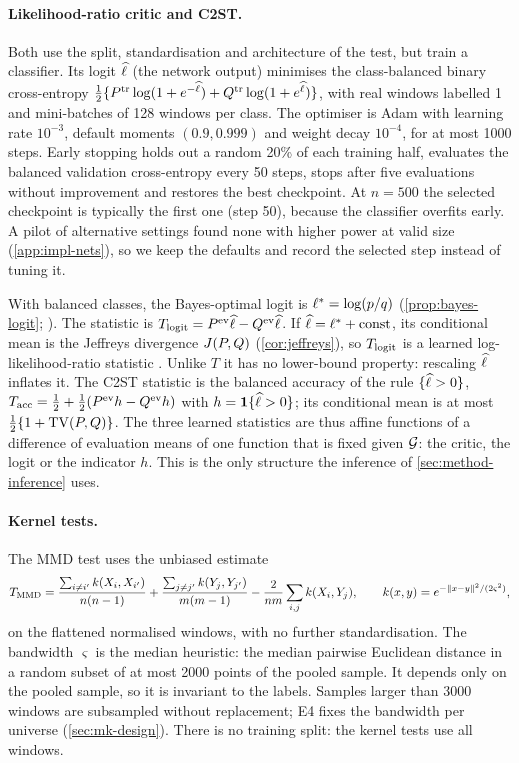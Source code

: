 \paragraph{Likelihood-ratio critic and C2ST.}
Both use the split, standardisation and architecture of the \WC{} test, but train a classifier.
Its logit $\widehat{\ell}$ (the network output) minimises the class-balanced binary cross-entropy
$\tfrac12\{P^{\mathrm{tr}}\log(1+e^{-\widehat{\ell}})+Q^{\mathrm{tr}}\log(1+e^{\widehat{\ell}})\}$, with real windows labelled 1 and
mini-batches of 128 windows per class. The optimiser is Adam with learning rate $10^{-3}$,
default moments $(0.9,0.999)$ and weight decay $10^{-4}$, for at most 1000 steps. Early stopping
holds out a random 20\% of each training half, evaluates the balanced validation cross-entropy
every 50 steps, stops after five evaluations without improvement and restores the best
checkpoint. At $n=500$ the selected checkpoint is typically the first one (step 50), because
the classifier overfits early. A pilot of alternative settings found none with higher
power at valid size (\cref{app:impl-nets}), so we keep the defaults and record the selected step instead of tuning it.

With balanced classes, the Bayes-optimal logit is $\ell^{*}=\log(p/q)$ (\cref{prop:bayes-logit};
\citealp{goodfellow2014generative}). The \LRC{} statistic is $T_{\mathrm{logit}}=P^{\mathrm{ev}}\widehat{\ell}-Q^{\mathrm{ev}}\widehat{\ell}$. If
$\widehat{\ell}=\ell^{*}+\text{const}$, its conditional mean is the Jeffreys divergence $J(P,Q)$
(\cref{cor:jeffreys}), so $T_{\mathrm{logit}}$ is a learned log-likelihood-ratio statistic
\citep{cheng2022classification}. Unlike $T$ it has no lower-bound property: rescaling $\widehat{\ell}$
inflates it. The C2ST statistic \citep{lopezpaz2017revisiting,kim2021classification} is the
balanced accuracy of the rule $\{\widehat{\ell}>0\}$,
$T_{\mathrm{acc}}=\tfrac12+\tfrac12(P^{\mathrm{ev}} h-Q^{\mathrm{ev}} h)$ with $h=\mathbf{1}\{\widehat{\ell}>0\}$; its conditional mean is at
most $\tfrac12\{1+\operatorname{TV}(P,Q)\}$. The three learned statistics are thus affine functions of a
difference of evaluation means of one function that is fixed given $\mathcal{G}$: the critic, the
logit or the indicator $h$. This is the only structure the inference of
\cref{sec:method-inference} uses.

\paragraph{Kernel tests.}
The MMD test \citep{gretton2012kernel} uses the unbiased estimate
\begin{equation}\label{eq:mmd-u}
  T_{\mathrm{MMD}}=\frac{\sum_{i\neq i'}k(X_i,X_{i'})}{n(n-1)}+\frac{\sum_{j\neq j'}k(Y_j,Y_{j'})}{m(m-1)}
  -\frac{2}{nm}\sum_{i,j}k(X_i,Y_j),\qquad k(x,y)=e^{-\lVert x-y\rVert^2/(2\varsigma^2)},
\end{equation}
on the flattened normalised windows, with no further standardisation. The bandwidth
$\varsigma$ is the median heuristic: the median pairwise Euclidean distance in a random subset
of at most 2000 points of the pooled sample. It depends only on the pooled sample, so it is
invariant to the labels. Samples larger than 3000 windows are subsampled without replacement;
E4 fixes the bandwidth per universe (\cref{sec:mk-design}). There is no training split: the
kernel tests use all windows.

